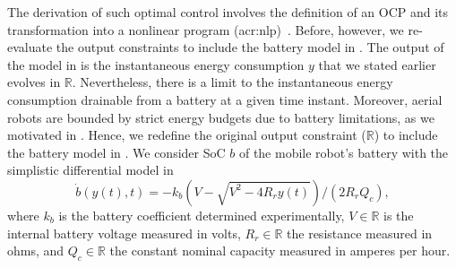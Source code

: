 The derivation of such optimal control involves the definition of an OCP and its transformation into a nonlinear program (\Gls{acr:nlp})~\citep{rawlings2017model,grune2017nonlinear}. Before, however, we re-evaluate the output constraints to include the battery model in . 
The output of the model in  is the instantaneous energy consumption $y$ that we stated earlier evolves in $\mathbb{R}$. Nevertheless, there is a limit to the instantaneous energy consumption drainable from a battery at a given time instant. Moreover, aerial robots are bounded by strict energy budgets due to battery limitations, as we motivated in . Hence, we redefine the original output constraint ($\mathbb{R}$) to include the battery model in . We consider SoC $b$ of the mobile robot's battery with the simplistic differential model in 
\begin{equation}\label{eq:bat}
  \dot{b}(y(t),t)=-k_b\left(V-
  \sqrt{
    V^2-
    4R_ry(t)}
  \right)/(2R_rQ_c),
\end{equation}
where $k_b$ is the battery coefficient determined experimentally,  $V\in\mathbb{R}$ is the internal battery voltage measured in volts, $R_r\in\mathbb{R}$ the resistance measured in ohms, and $Q_c\in\mathbb{R}$ the constant nominal capacity measured in amperes per hour. 

